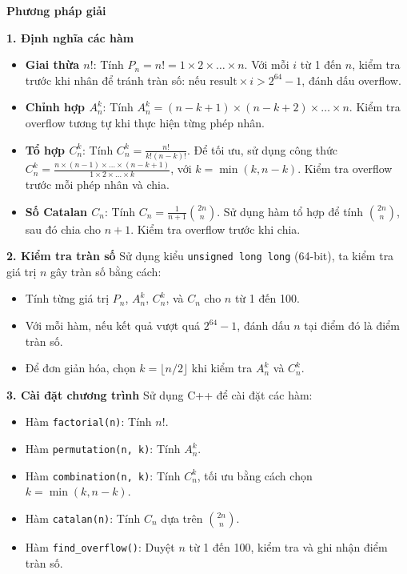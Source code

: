\documentclass[a4paper,12pt]{article}
\begin{document}
\textbf{Phương pháp giải}

\textbf{1. Định nghĩa các hàm}
\begin{itemize}
    \item \textbf{Giai thừa \( n! \)}: Tính \( P_n = n! = 1 \times 2 \times \dots \times n \). Với mỗi \( i \) từ 1 đến \( n \), kiểm tra trước khi nhân để tránh tràn số: nếu \( \text{result} \times i > 2^{64} - 1 \), đánh dấu overflow.
    \item \textbf{Chỉnh hợp \( A_n^k \)}: Tính \( A_n^k = (n-k+1) \times (n-k+2) \times \dots \times n \). Kiểm tra overflow tương tự khi thực hiện từng phép nhân.
    \item \textbf{Tổ hợp \( C_n^k \)}: Tính \( C_n^k = \frac{n!}{k!(n-k)!} \). Để tối ưu, sử dụng công thức \( C_n^k = \frac{n \times (n-1) \times \dots \times (n-k+1)}{1 \times 2 \times \dots \times k} \), với \( k = \min(k, n-k) \). Kiểm tra overflow trước mỗi phép nhân và chia.
    \item \textbf{Số Catalan \( C_n \)}: Tính \( C_n = \frac{1}{n+1} \binom{2n}{n} \). Sử dụng hàm tổ hợp để tính \( \binom{2n}{n} \), sau đó chia cho \( n+1 \). Kiểm tra overflow trước khi chia.
\end{itemize}

\textbf{2. Kiểm tra tràn số}
Sử dụng kiểu \texttt{unsigned long long} (64-bit), ta kiểm tra giá trị \( n \) gây tràn số bằng cách:
\begin{itemize}
    \item Tính từng giá trị \( P_n \), \( A_n^k \), \( C_n^k \), và \( C_n \) cho \( n \) từ 1 đến 100.
    \item Với mỗi hàm, nếu kết quả vượt quá \( 2^{64} - 1 \), đánh dấu \( n \) tại điểm đó là điểm tràn số.
    \item Để đơn giản hóa, chọn \( k = \lfloor n/2 \rfloor \) khi kiểm tra \( A_n^k \) và \( C_n^k \).
\end{itemize}

\textbf{3. Cài đặt chương trình}
Sử dụng C++ để cài đặt các hàm:
\begin{itemize}
    \item Hàm \texttt{factorial(n)}: Tính \( n! \).
    \item Hàm \texttt{permutation(n, k)}: Tính \( A_n^k \).
    \item Hàm \texttt{combination(n, k)}: Tính \( C_n^k \), tối ưu bằng cách chọn \( k = \min(k, n-k) \).
    \item Hàm \texttt{catalan(n)}: Tính \( C_n \) dựa trên \( \binom{2n}{n} \).
    \item Hàm \texttt{find\_overflow()}: Duyệt \( n \) từ 1 đến 100, kiểm tra và ghi nhận điểm tràn số.
\end{itemize}
\end{document}
